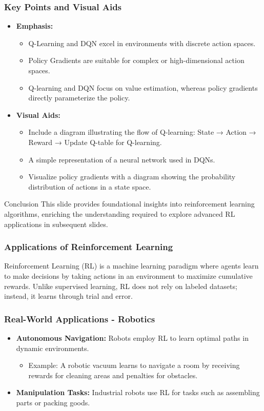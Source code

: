 \documentclass[aspectratio=169]{beamer}
\begin{document}
\begin{frame}[fragile]
    \frametitle{Key Points and Visual Aids}
    \begin{itemize}
        \item \textbf{Emphasis:}
        \begin{itemize}
            \item Q-Learning and DQN excel in environments with discrete action spaces.
            \item Policy Gradients are suitable for complex or high-dimensional action spaces.
            \item Q-learning and DQN focus on value estimation, whereas policy gradients directly parameterize the policy.
        \end{itemize}
        \item \textbf{Visual Aids:}
        \begin{itemize}
            \item Include a diagram illustrating the flow of Q-learning: State → Action → Reward → Update Q-table for Q-learning.
            \item A simple representation of a neural network used in DQNs.
            \item Visualize policy gradients with a diagram showing the probability distribution of actions in a state space.
        \end{itemize}
    \end{itemize}

    \begin{block}{Conclusion}
        This slide provides foundational insights into reinforcement learning algorithms, enriching the understanding required to explore advanced RL applications in subsequent slides.
    \end{block}
\end{frame}

\begin{frame}[fragile]
  \frametitle{Applications of Reinforcement Learning}
  Reinforcement Learning (RL) is a machine learning paradigm where agents learn to make decisions by taking actions in an environment to maximize cumulative rewards. Unlike supervised learning, RL does not rely on labeled datasets; instead, it learns through trial and error.
\end{frame}

\begin{frame}[fragile]
  \frametitle{Real-World Applications - Robotics}
  \begin{itemize}
    \item \textbf{Autonomous Navigation:} Robots employ RL to learn optimal paths in dynamic environments.
    \begin{itemize}
      \item Example: A robotic vacuum learns to navigate a room by receiving rewards for cleaning areas and penalties for obstacles.
    \end{itemize}
    \item \textbf{Manipulation Tasks:} Industrial robots use RL for tasks such as assembling parts or packing goods.
  \end{itemize}
\end{frame}
\end{document}
